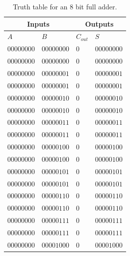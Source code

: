 \documentclass[conference]{IEEEtran}
\begin{document}
	\begin{table}
		\centering
		\begin{tabular}{|m{1.2cm}|m{1.2cm}|m{0.5cm}|m{1.2cm}|}
			\hline
			\multicolumn{2}{|c|}{Inputs} & \multicolumn{2}{c|}{Outputs} \\
			\hline
			\(A\) & \(B\) & \(C_{out}\) & \(S\) \\
			\centering\(00000000\) & \centering\(00000000\) & \centering\(0\) & \(00000000\) \\ \hline
			\centering\(00000000\) & \centering\(00000000\) & \centering\(0\) & \(00000000\) \\ \hline
			\centering\(00000000\) & \centering\(00000001\) & \centering\(0\) & \(00000001\) \\ \hline
			\centering\(00000000\) & \centering\(00000001\) & \centering\(0\) & \(00000001\) \\ \hline
			\centering\(00000000\) & \centering\(00000010\) & \centering\(0\) & \(00000010\) \\ \hline
			\centering\(00000000\) & \centering\(00000010\) & \centering\(0\) & \(00000010\) \\ \hline
			\centering\(00000000\) & \centering\(00000011\) & \centering\(0\) & \(00000011\) \\ \hline
			\centering\(00000000\) & \centering\(00000011\) & \centering\(0\) & \(00000011\) \\ \hline
			\centering\(00000000\) & \centering\(00000100\) & \centering\(0\) & \(00000100\) \\ \hline
			\centering\(00000000\) & \centering\(00000100\) & \centering\(0\) & \(00000100\) \\ \hline
			\centering\(00000000\) & \centering\(00000101\) & \centering\(0\) & \(00000101\) \\ \hline
			\centering\(00000000\) & \centering\(00000101\) & \centering\(0\) & \(00000101\) \\ \hline
			\centering\(00000000\) & \centering\(00000110\) & \centering\(0\) & \(00000110\) \\ \hline
			\centering\(00000000\) & \centering\(00000110\) & \centering\(0\) & \(00000110\) \\ \hline
			\centering\(00000000\) & \centering\(00000111\) & \centering\(0\) & \(00000111\) \\ \hline
			\centering\(00000000\) & \centering\(00000111\) & \centering\(0\) & \(00000111\) \\ \hline
			\centering\(00000000\) & \centering\(00001000\) & \centering\(0\) & \(00001000\) \\ \hline
			
			\hline
		\end{tabular}
		\caption{Truth table for an 8 bit full adder.}
		\label{tab:FA_16B_TT}
	\end{table}
	
\end{document}

